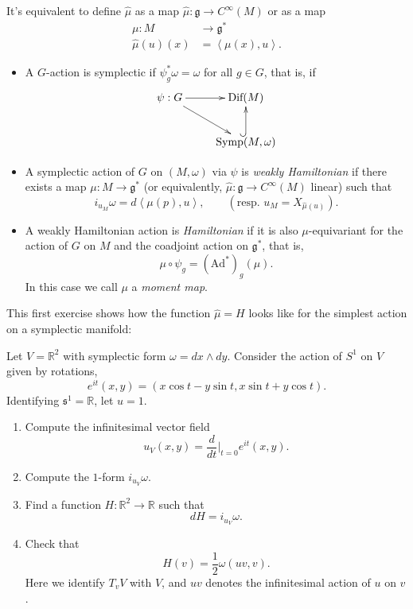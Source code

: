 It's equivalent to define $\hat{\mu}$
as a map
$\hat{\mu}:\mathfrak{g}\to C^\infty(M)$
or as a map
$$
\begin{aligned}
\mu: M &\longrightarrow \mathfrak{g}^* \\
\hat{\mu}(u)(x) &= \left\langle{}\mu(x),u\right\rangle{}.
\end{aligned}
$$

\begin{definition}
\label{definition-moment-map}
\begin{itemize}
\item A $G$-action is symplectic if
$\psi_g^*\omega=\omega$ for all $g \in G$,
that is, if
$$
\xymatrix{
\psi:G\ar[r]\ar[dr]&\text{Dif}(M)\\
&\text{Symp}(M,\omega)\ar@{^{(}->}[u].
}
$$

\item A symplectic action of $G$ on
$(M,\omega)$ via $\psi$
is {\it weakly Hamiltonian}
if there exists a map
$\mu:M \to \mathfrak{g}^*$
(or equivalently,
$\hat{\mu}:\mathfrak{g} \to C^\infty(M)$
linear) such that
$$
i_{u_M}\omega=d\left\langle{}\mu(p),u\right\rangle{},\qquad
(\text{resp. } u_M=X_{\hat{\mu}(u)}).
$$

\item A weakly Hamiltonian action is
{\it Hamiltonian} if it is also
$\mu$-equivariant for the action of $G$ on
$M$ and the coadjoint action on
$\mathfrak{g}^*$, that is,
$$
\mu \circ \psi_g=(\text{Ad}^*)_g(\mu).
$$
In this case we call $\mu$ a {\it moment
map}.
\end{itemize}
\end{definition}

\noindent
This first exercise shows how
the function $\hat{\mu} = H$
looks like for the simplest
action on a symplectic manifold:

\begin{exercise}
\label{exercise-linear-moment-map-rotation}
Let $V=\mathbb{R}^2$ with symplectic form
$\omega=dx\wedge dy$.
Consider the action of $S^1$ on $V$
given by rotations,
$$
e^{it}(x,y)=
(x\cos t-y\sin t,x\sin t+y\cos t).
$$
Identifying $\mathfrak{s}^1=\mathbb{R}$,
let $u=1$.
\begin{enumerate}
\item Compute the infinitesimal vector field
$$
u_V(x,y)=
\frac{d}{dt}\Big|_{t=0} e^{it}(x,y).
$$
\item Compute the $1$-form $i_{u_V}\omega$.
\item Find a function $H:\mathbb{R}^2
\to \mathbb{R}$ such that
$$
dH=i_{u_V}\omega.
$$
\item Check that
$$
H(v)=\frac{1}{2}\omega(uv,v).
$$
Here we identify $T_vV$ with $V$, and $uv$
denotes the infinitesimal action of $u$ on
$v$.
\end{enumerate}
\end{exercise}

